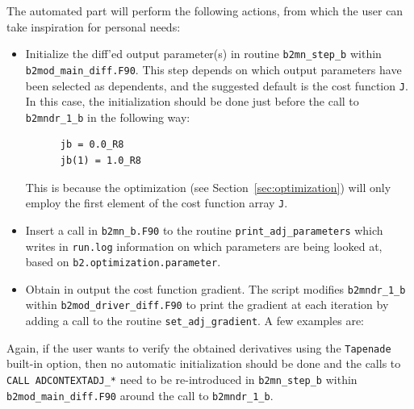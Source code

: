 The automated part will perform the following actions, from which the user can take inspiration for personal needs:
\begin{itemize}
  \item Initialize the diff'ed output parameter(s) in routine {\tt b2mn\_step\_b} within {\tt b2mod\_main\_diff.F90}. This step depends on which output parameters have been selected as dependents, and the suggested default is the cost function {\tt J}. In this case, the initialization should be done just before the call to {\tt b2mndr\_1\_b} in the following way:
    \begin{verbatim}
      jb = 0.0_R8
      jb(1) = 1.0_R8
    \end{verbatim}
    This is because the optimization (see Section~\ref{sec:optimization}) will only employ the first element of the cost function array {\tt J}.

  \item Insert a call in {\tt b2mn\_b.F90} to the routine {\tt print\_adj\_parameters} which writes in {\tt run.log} information on which parameters are being looked at, based on {\tt b2.optimization.parameter}.

  \item Obtain in output the cost function gradient. The script modifies {\tt b2mndr\_1\_b} within {\tt b2mod\_driver\_diff.F90} to print the gradient at each iteration by adding a call to the routine {\tt set\_adj\_gradient}. A few examples are:
\end{itemize}

Again, if the user wants to verify the obtained derivatives using the {\tt Tapenade} built-in option, then no automatic initialization should be done and the calls to {\tt CALL ADCONTEXTADJ\_*} need to be re-introduced in {\tt b2mn\_step\_b} within {\tt b2mod\_main\_diff.F90} around the call to {\tt b2mndr\_1\_b}.

